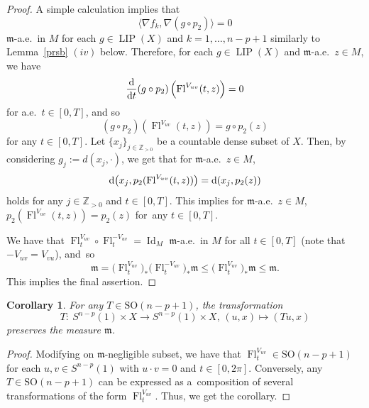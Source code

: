 \documentclass[pdftex]{sigma}
\numberwithin{equation}{section}
\newtheorem{Cor}[Thm]{Corollary}
\theoremstyle{definition}
\newcommand{\Id}{\operatorname{Id}}
\newcommand{\LIP}{\operatorname{LIP}}
\newcommand{\Fl}{\operatorname{Fl}}
\newcommand{\Z}{\mathbb{Z}}
\newcommand{\mf}{\mathfrak{m}}
\begin{document}
\begin{proof}
{}


A simple calculation implies that
\[
\langle \nabla f_k,\nabla (g\circ p_2)\rangle=0
\]
$\mf$-a.e.\ in $M$ for each $g\in \LIP(X)$ and $k=1,\ldots, n-p+1$ similarly to Lemma~\ref{prsb} $(iv)$ below.
Therefore, for each $g\in \LIP(X)$ and $\mf$-a.e.\ $z\in M$, we have
\[
\frac{\rm d}{{\rm d} t}(g\circ p_2) \left(\Fl^{V_{u v}}(t,z)\right)=0
\]
for a.e.\ $t\in [0,T]$, and so
\[
(g\circ p_2) \left(\Fl^{V_{u v}}(t,z)\right)=g\circ p_2(z)
\]
for any $t\in[0,T]$.
Let $\{x_j\}_{j\in \Z_{>0}}$ be a countable dense subset of $X$.
Then, by considering $g_j:=d(x_j,\cdot)$, we get that for $\mf$-a.e.\ $z\in M$,
\[
{\rm d}\big(x_j,p_2(\Fl^{V_{u v}}(t,z))\big)={\rm d}(x_j,p_2(z))
\]
holds
for any $j\in\Z_{>0}$ and $t\in [0,T]$.
This implies for $\mf$-a.e.\ $z\in M$,
$p_2\left(\Fl^{V_{u v}}(t,z)\right)=p_2(z)$ for~any $t\in [0,T]$.

We have that $\Fl^{V_{u v}}_t\circ \Fl_t^{-V_{u v}}=\Id_M$ $\mf$-a.e.\ in $M$ for all $t\in[0,T]$ (note that $-V_{u v}=V_{v u}$), and~so
\[
\mf=\big(\Fl^{V_{u v}}_t\big)_\ast \big(\Fl_t^{-V_{u v}}\big)_\ast \mf
\leq \big(\Fl_t^{V_{u v}}\big)_\ast\mf\leq \mf.
\]
This implies the final assertion.
\end{proof}

\begin{Cor}\label{presm}
For any $T\in \mathrm{SO}(n-p+1)$, the transformation
\[
T\colon\ S^{n-p}(1)\times X\to S^{n-p}(1)\times X,\, (u,x)\mapsto (T u, x)
\]
preserves the measure $\mf$.
\end{Cor}
\begin{proof}
Modifying on $\mf$-negligible subset, we have that $\Fl^{V_{u v}}_t\in \mathrm{SO}(n-p+1)$ for each $u,v\in S^{n-p}(1)$ with $u\cdot v=0$ and $t\in [0,2\pi]$.
Conversely, any $T\in \mathrm{SO}(n-p+1)$ can be expressed as a~composition of several transformations of the form $\Fl^{V_{u v}}_t$.
Thus, we get the corollary.
\end{proof}
\end{document}
